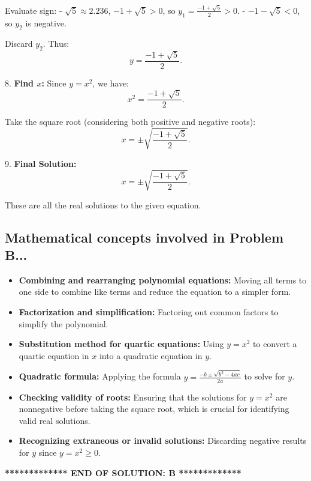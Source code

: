 \documentclass[12pt,a4paper]{article}
\begin{document}
Evaluate sign:
- $\sqrt{5} \approx 2.236$, $-1+\sqrt{5}>0$, so $y_1 = \frac{-1+\sqrt{5}}{2}>0$.
- $-1-\sqrt{5}<0$, so $y_2$ is negative.

Discard $y_2$. Thus:
\[
y = \frac{-1 + \sqrt{5}}{2}.
\]

\bigskip

8. \textbf{Find $x$:}  
Since $y = x^2$, we have:
\[
x^2 = \frac{-1+\sqrt{5}}{2}.
\]

Take the square root (considering both positive and negative roots):
\[
x = \pm \sqrt{\frac{-1 + \sqrt{5}}{2}}.
\]

\bigskip

9. \textbf{Final Solution:}
\[
\boxed{x = \pm \sqrt{\frac{-1 + \sqrt{5}}{2}}}.
\]

These are all the real solutions to the given equation.

\bigskip
\subsection*{Mathematical concepts involved in Problem B...}
\begin{itemize}
    \item \textbf{Combining and rearranging polynomial equations:} Moving all terms to one side to combine like terms and reduce the equation to a simpler form.
    \item \textbf{Factorization and simplification:} Factoring out common factors to simplify the polynomial.
    \item \textbf{Substitution method for quartic equations:} Using $y = x^2$ to convert a quartic equation in $x$ into a quadratic equation in $y$.
    \item \textbf{Quadratic formula:} Applying the formula $y=\frac{-b \pm \sqrt{b^2-4ac}}{2a}$ to solve for $y$.
    \item \textbf{Checking validity of roots:} Ensuring that the solutions for $y = x^2$ are nonnegative before taking the square root, which is crucial for identifying valid real solutions.
    \item \textbf{Recognizing extraneous or invalid solutions:} Discarding negative results for $y$ since $y = x^2 \geq 0$.
\end{itemize}

\noindent\hrulefill
\begin{center}
\textbf{************* END OF SOLUTION: B *************}
\end{center}
\hrulefill
\end{document}
